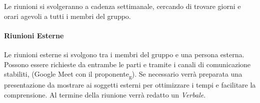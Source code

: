 Le riunioni si svolgeranno a cadenza settimanale, cercando di trovare giorni e orari agevoli a tutti i membri del gruppo.

\paragraph{Riunioni Esterne}
Le riunioni esterne si svolgono tra i membri del gruppo e una persona esterna. Possono essere richieste da entrambe le parti 
e tramite i canali di comunicazione stabiliti, (Google Meet con il proponente\textsubscript{g}). Se necessario verrà preparata una presentazione 
da mostrare ai soggetti esterni per ottimizzare i tempi e facilitare la comprensione. Al termine della riunione verrà redatto un 
\textit{Verbale}. 
